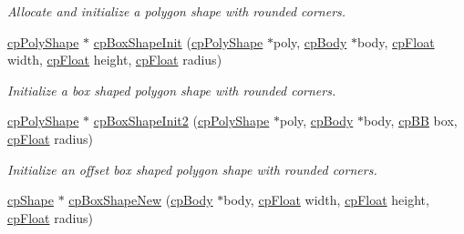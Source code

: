 \begin{DoxyCompactItemize}
\begin{DoxyCompactList}\small\item\em Allocate and initialize a polygon shape with rounded corners. \end{DoxyCompactList}\item 
\hypertarget{group__cp_poly_shape_gac9ef09adb77a16dfff72ff5e60f29abd}{}\hyperlink{structcp_poly_shape}{cp\+Poly\+Shape} $\ast$ \hyperlink{group__cp_poly_shape_gac9ef09adb77a16dfff72ff5e60f29abd}{cp\+Box\+Shape\+Init} (\hyperlink{structcp_poly_shape}{cp\+Poly\+Shape} $\ast$poly, \hyperlink{structcp_body}{cp\+Body} $\ast$body, \hyperlink{group__basic_types_gac1ed65573e035bf892505768c852d8d3}{cp\+Float} width, \hyperlink{group__basic_types_gac1ed65573e035bf892505768c852d8d3}{cp\+Float} height, \hyperlink{group__basic_types_gac1ed65573e035bf892505768c852d8d3}{cp\+Float} radius)\label{group__cp_poly_shape_gac9ef09adb77a16dfff72ff5e60f29abd}

\begin{DoxyCompactList}\small\item\em Initialize a box shaped polygon shape with rounded corners. \end{DoxyCompactList}\item 
\hypertarget{group__cp_poly_shape_ga7d8d6290beece9f96d9094ec13e9fbdc}{}\hyperlink{structcp_poly_shape}{cp\+Poly\+Shape} $\ast$ \hyperlink{group__cp_poly_shape_ga7d8d6290beece9f96d9094ec13e9fbdc}{cp\+Box\+Shape\+Init2} (\hyperlink{structcp_poly_shape}{cp\+Poly\+Shape} $\ast$poly, \hyperlink{structcp_body}{cp\+Body} $\ast$body, \hyperlink{structcp_b_b}{cp\+B\+B} box, \hyperlink{group__basic_types_gac1ed65573e035bf892505768c852d8d3}{cp\+Float} radius)\label{group__cp_poly_shape_ga7d8d6290beece9f96d9094ec13e9fbdc}

\begin{DoxyCompactList}\small\item\em Initialize an offset box shaped polygon shape with rounded corners. \end{DoxyCompactList}\item 
\hypertarget{group__cp_poly_shape_gabccd1670c039d4540d98365eebd0c467}{}\hyperlink{structcp_shape}{cp\+Shape} $\ast$ \hyperlink{group__cp_poly_shape_gabccd1670c039d4540d98365eebd0c467}{cp\+Box\+Shape\+New} (\hyperlink{structcp_body}{cp\+Body} $\ast$body, \hyperlink{group__basic_types_gac1ed65573e035bf892505768c852d8d3}{cp\+Float} width, \hyperlink{group__basic_types_gac1ed65573e035bf892505768c852d8d3}{cp\+Float} height, \hyperlink{group__basic_types_gac1ed65573e035bf892505768c852d8d3}{cp\+Float} radius)\label{group__cp_poly_shape_gabccd1670c039d4540d98365eebd0c467}


\end{DoxyCompactItemize}
